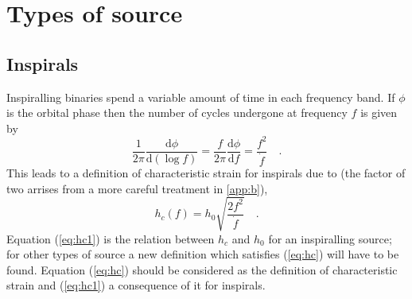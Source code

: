 \section{Types of source}\label{sec:voc}

\subsection{Inspirals}\label{sec:insp}
Inspiralling binaries spend a variable amount of time in each frequency band. If $\phi$ is the orbital phase then the number of cycles undergone at frequency $f$ is given by
\begin{equation}\label{eq:inspiral}
 \frac{1}{2\pi}\frac{\textrm{d}\phi}{\textrm{d}\left(\log f\right)} = \frac{f}{2\pi}\frac{\textrm{d}\phi}{\textrm{d}f}=\frac{f^{2}}{\dot{f}} \quad .
\end{equation}
This leads to a definition of characteristic strain for inspirals due to \cite{FinnThorne} (the factor of two arrises from a more careful treatment in \ref{app:b}),
\begin{equation}\label{eq:hc1} h_{c}(f)=h_{0}\sqrt{\frac{2f^{2}}{\dot{f}}} \quad . \end{equation}
Equation (\ref{eq:hc1}) is the relation between $h_{c}$ and $h_{0}$ for an inspiralling source; for other types of source a new definition which satisfies (\ref{eq:hc}) will have to be found. Equation (\ref{eq:hc}) should be considered as the definition of characteristic strain and (\ref{eq:hc1}) a consequence of it for inspirals. 




